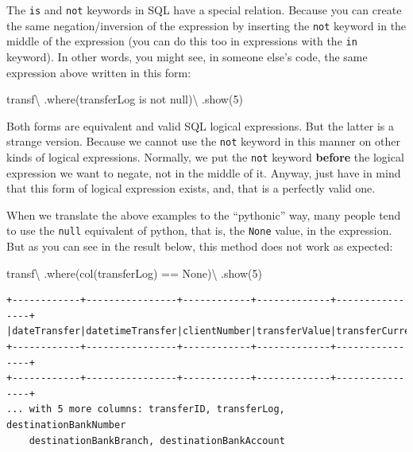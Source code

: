 \documentclass[
  11pt,
  letterpaper,
  DIV=11,
  numbers=noendperiod]{scrreprt}
\newenvironment{Shaded}{\begin{snugshade}}{\end{snugshade}}
\newcommand{\DecValTok}[1]{\textcolor[rgb]{0.68,0.00,0.00}{#1}}
\newcommand{\NormalTok}[1]{\textcolor[rgb]{0.00,0.23,0.31}{#1}}
\newcommand{\OperatorTok}[1]{\textcolor[rgb]{0.37,0.37,0.37}{#1}}
\newcommand{\StringTok}[1]{\textcolor[rgb]{0.13,0.47,0.30}{#1}}
\newcommand{\VariableTok}[1]{\textcolor[rgb]{0.07,0.07,0.07}{#1}}
\begin{document}
The \texttt{is} and \texttt{not} keywords in SQL have a special
relation. Because you can create the same negation/inversion of the
expression by inserting the \texttt{not} keyword in the middle of the
expression (you can do this too in expressions with the \texttt{in}
keyword). In other words, you might see, in someone else's code, the
same expression above written in this form:

\begin{Shaded}
\begin{Highlighting}[]
\NormalTok{transf}\OperatorTok{\textbackslash{}}
\NormalTok{  .where(}\StringTok{\textquotesingle{}transferLog is not null\textquotesingle{}}\NormalTok{)}\OperatorTok{\textbackslash{}}
\NormalTok{  .show(}\DecValTok{5}\NormalTok{)}
\end{Highlighting}
\end{Shaded}

Both forms are equivalent and valid SQL logical expressions. But the
latter is a strange version. Because we cannot use the \texttt{not}
keyword in this manner on other kinds of logical expressions. Normally,
we put the \texttt{not} keyword \textbf{before} the logical expression
we want to negate, not in the middle of it. Anyway, just have in mind
that this form of logical expression exists, and, that is a perfectly
valid one.

When we translate the above examples to the ``pythonic'' way, many
people tend to use the \texttt{null} equivalent of python, that is, the
\texttt{None} value, in the expression. But as you can see in the result
below, this method does not work as expected:

\begin{Shaded}
\begin{Highlighting}[]
\NormalTok{transf}\OperatorTok{\textbackslash{}}
\NormalTok{  .where(col(}\StringTok{\textquotesingle{}transferLog\textquotesingle{}}\NormalTok{) }\OperatorTok{==} \VariableTok{None}\NormalTok{)}\OperatorTok{\textbackslash{}}
\NormalTok{  .show(}\DecValTok{5}\NormalTok{)}
\end{Highlighting}
\end{Shaded}

\begin{verbatim}
+------------+----------------+------------+-------------+----------------+
|dateTransfer|datetimeTransfer|clientNumber|transferValue|transferCurrency|
+------------+----------------+------------+-------------+----------------+
+------------+----------------+------------+-------------+----------------+
... with 5 more columns: transferID, transferLog, destinationBankNumber
    destinationBankBranch, destinationBankAccount
\end{verbatim}
\end{document}
